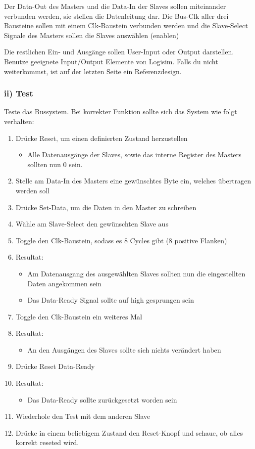 \documentclass[a4paper]{scrartcl}
\begin{document}
Der Data-Out des Masters und die Data-In der Slaves sollen miteinander verbunden werden, sie stellen die Datenleitung dar.
Die Bus-Clk aller drei Bausteine sollen mit einem Clk-Baustein verbunden werden und die Slave-Select Signale des Masters
sollen die Slaves auswählen (enablen)

Die restlichen Ein- und Ausgänge sollen User-Input oder Output darstellen. Benutze geeignete Input/Output Elemente von Logisim. Falls du nicht 
weiterkommst, ist auf der letzten Seite ein Referenzdesign. 

\subsubsection*{ii) Test}
Teste das Bussystem. Bei korrekter Funktion sollte sich das System wie folgt verhalten:
\begin{enumerate}
  \item Drücke Reset, um einen definierten Zustand herzustellen
  \begin{itemize}
    \item Alle Datenausgänge der Slaves, sowie das interne Register des Masters sollten nun 0 sein.
  \end{itemize}
  \item Stelle am Data-In des Masters eine gewünschtes Byte ein, welches übertragen werden soll
  \item Drücke Set-Data, um die Daten in den Master zu schreiben
  \item Wähle am Slave-Select den gewünschten Slave aus
  \item Toggle den Clk-Baustein, sodass es 8 Cycles gibt (8 positive Flanken)
  \item Resultat:
  \begin{itemize}
    \item Am Datenausgang des ausgewählten Slaves sollten nun die eingestellten Daten angekommen sein 
    \item Das Data-Ready Signal sollte auf high gesprungen sein
  \end{itemize}
  \item Toggle den Clk-Baustein ein weiteres Mal
  \item Resultat:
  \begin{itemize}
    \item An den Ausgängen des Slaves sollte sich nichts verändert haben
  \end{itemize}
  \item Drücke Reset Data-Ready
  \item Resultat:
  \begin{itemize}
    \item Das Data-Ready sollte zurückgesetzt worden sein
  \end{itemize}
  \item Wiederhole den Test mit dem anderen Slave
  \item Drücke in einem beliebigem Zustand den Reset-Knopf und schaue, ob alles korrekt reseted wird.
\end{enumerate}
\end{document}
